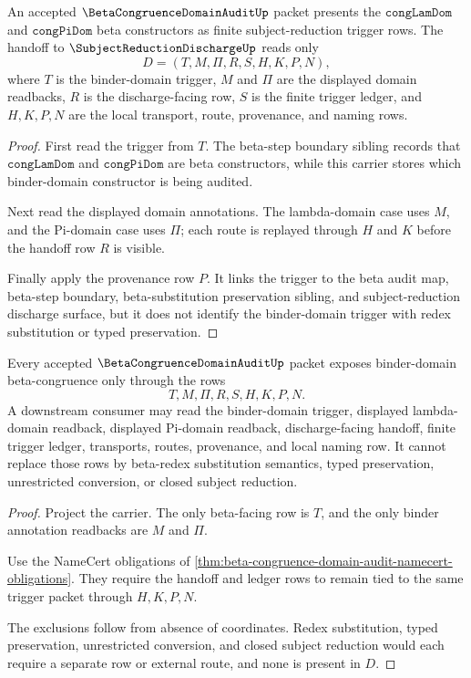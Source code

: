 \begin{theorem}
\label{thm:beta-congruence-domain-audit-trigger-handoff}
An accepted $\BetaCongruenceDomainAuditUp$ packet presents the $\texttt{congLamDom}$ and $\texttt{congPiDom}$ beta constructors as finite subject-reduction trigger rows. The handoff to $\SubjectReductionDischargeUp$ reads only
$$
D=(T,M,\Pi,R,S,H,K,P,N),
$$
where $T$ is the binder-domain trigger, $M$ and $\Pi$ are the displayed domain readbacks, $R$ is the discharge-facing row, $S$ is the finite trigger ledger, and $H,K,P,N$ are the local transport, route, provenance, and naming rows.
\end{theorem}
\begin{proof}
First read the trigger from $T$. The beta-step boundary sibling records that $\texttt{congLamDom}$ and $\texttt{congPiDom}$ are beta constructors, while this carrier stores which binder-domain constructor is being audited.

Next read the displayed domain annotations. The lambda-domain case uses $M$, and the Pi-domain case uses $\Pi$; each route is replayed through $H$ and $K$ before the handoff row $R$ is visible.

Finally apply the provenance row $P$. It links the trigger to the beta audit map, beta-step boundary, beta-substitution preservation sibling, and subject-reduction discharge surface, but it does not identify the binder-domain trigger with redex substitution or typed preservation.
\end{proof}

\begin{theorem}
\label{thm:beta-congruence-domain-audit-nonescape}
Every accepted $\BetaCongruenceDomainAuditUp$ packet exposes binder-domain beta-congruence only through the rows
$$
T,M,\Pi,R,S,H,K,P,N.
$$
A downstream consumer may read the binder-domain trigger, displayed lambda-domain readback, displayed Pi-domain readback, discharge-facing handoff, finite trigger ledger, transports, routes, provenance, and local naming row. It cannot replace those rows by beta-redex substitution semantics, typed preservation, unrestricted conversion, or closed subject reduction.
\end{theorem}
\begin{proof}
Project the carrier. The only beta-facing row is $T$, and the only binder annotation readbacks are $M$ and $\Pi$.

Use the NameCert obligations of \autoref{thm:beta-congruence-domain-audit-namecert-obligations}. They require the handoff and ledger rows to remain tied to the same trigger packet through $H,K,P,N$.

The exclusions follow from absence of coordinates. Redex substitution, typed preservation, unrestricted conversion, and closed subject reduction would each require a separate row or external route, and none is present in $D$.
\end{proof}


